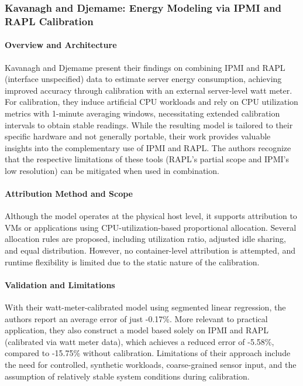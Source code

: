 \subsubsection{Kavanagh and Djemame: Energy Modeling via IPMI and RAPL Calibration}
\label{sec:kavanagh}

\paragraph{Overview and Architecture}
Kavanagh and Djemame\parencite{kavanagh2019rapid} present their findings on combining IPMI and RAPL (interface unspecified) data to estimate server energy consumption, achieving improved accuracy through calibration with an external server-level watt meter. For calibration, they induce artificial CPU workloads and rely on CPU utilization metrics with 1-minute averaging windows, necessitating extended calibration intervals to obtain stable readings. While the resulting model is tailored to their specific hardware and not generally portable, their work provides valuable insights into the complementary use of IPMI and RAPL. The authors recognize that the respective limitations of these tools (RAPL’s partial scope and IPMI’s low resolution) can be mitigated when used in combination.

\paragraph{Attribution Method and Scope}
Although the model operates at the physical host level, it supports attribution to VMs or applications using CPU-utilization-based proportional allocation. Several allocation rules are proposed, including utilization ratio, adjusted idle sharing, and equal distribution. However, no container-level attribution is attempted, and runtime flexibility is limited due to the static nature of the calibration.

\paragraph{Validation and Limitations}
With their watt-meter-calibrated model using segmented linear regression, the authors report an average error of just -0.17\%. More relevant to practical application, they also construct a model based solely on IPMI and RAPL (calibrated via watt meter data), which achieves a reduced error of -5.58\%, compared to -15.75\% without calibration. Limitations of their approach include the need for controlled, synthetic workloads, coarse-grained sensor input, and the assumption of relatively stable system conditions during calibration.

